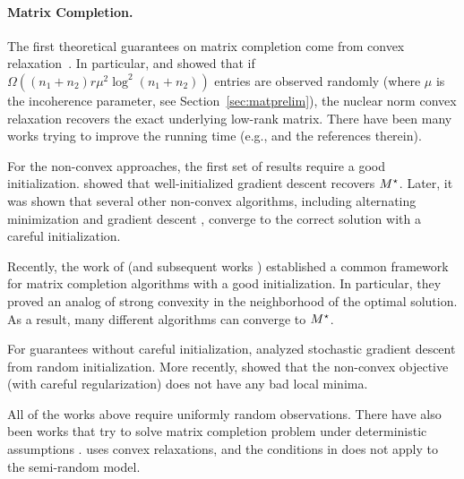 \paragraph{Matrix Completion.} The first theoretical guarantees on matrix completion come from convex relaxation~\citep{srebro2005rank,recht2011simpler,candes2010power,candes2009exact, negahban2012restricted}.
In particular, \cite{candes2010power} and \cite{recht2011simpler} showed that if $\Omega((n_1+n_2)r  \mu^2  \log^2 (n_1+n_2))$ entries are observed randomly (where $\mu$ is the incoherence parameter, see Section~\ref{sec:matprelim}), the nuclear norm convex relaxation recovers the exact underlying low-rank matrix. There have been many works trying to improve the running time (e.g., \citep{srebro2004maximum,mazumder2010spectral,hastie2014matrix} and the references therein).

For the non-convex approaches, the first set of results require a good initialization. \cite{keshavan2010matrix,keshavan2010matrixnoisy} showed that well-initialized gradient descent recovers $M^\star$. Later, it was shown that several other non-convex algorithms, including alternating minimization
\citep{jain2013low,hardt2014fast,hardt2014understanding} and gradient descent \citep{chen2015fast}, converge to the correct solution with a careful initialization. 

Recently, the work of \cite{sun2015guaranteed} (and subsequent works \citep{zhao2015nonconvex,zheng2016convergence,tu2015low}) established a common framework for matrix completion algorithms with a good initialization. In particular, they proved an analog of strong convexity in the neighborhood of the optimal solution. As a result, many different algorithms can converge to $M^\star$. 

For guarantees without careful initialization, \cite{DBLP:conf/icml/SaRO15} analyzed stochastic gradient descent from random initialization. More recently, \cite{ge2016matrix,park2016non,GeJZ17,chen2017memory} showed that the non-convex objective (with careful regularization) does not have any bad local minima.

All of the works above require uniformly random observations. There have also been works that try to solve matrix completion problem under deterministic assumptions \citep{BhojanapalliJ14, LiLR16}. \citep{BhojanapalliJ14} uses convex relaxations, and the conditions in \citep{LiLR16} does not apply to the semi-random model.

